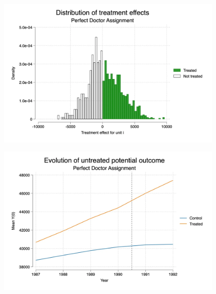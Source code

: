 \documentclass{beamer}
\begin{document}
\begin{frame}
 
\begin{figure}
    \centering
    \includegraphics[width=\textwidth]{./lecture_includes/selection_te}
\end{figure}

\end{frame}

\begin{frame}
 
\begin{figure}
    \centering
    \includegraphics[width=\textwidth]{./lecture_includes/roy_diverging_po}
\end{figure}

\end{frame}
\end{document}
